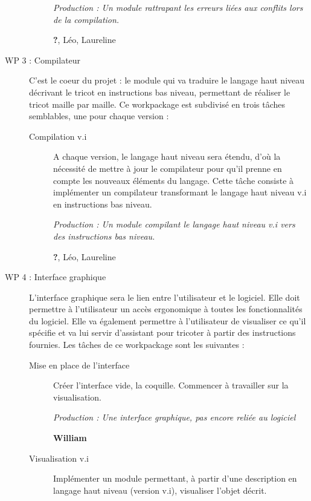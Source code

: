 \documentclass{article}
\begin{document}
\begin{description}
\begin{description}
      \textit{Production : Un module rattrapant les erreurs liées aux conflits lors de la compilation.}

      \textbf{?}, Léo, Laureline

    \end{description}

\medskip

\item[WP 3 : Compilateur] C'est le coeur du projet : le module qui va traduire le langage haut niveau décrivant le tricot en instructions bas niveau, permettant de réaliser le tricot maille par maille. Ce workpackage est subdivisé en trois tâches semblables, une pour chaque version :

    \begin{description}
    \item[Compilation v.i] A chaque version, le langage haut niveau sera étendu, d'où la nécessité de mettre à jour le compilateur pour qu'il prenne en compte les nouveaux éléments du langage. Cette tâche consiste à implémenter un compilateur transformant le langage haut niveau v.i en instructions bas niveau.

      \textit{Production : Un module compilant le langage haut niveau v.i vers des instructions bas niveau.}

      \textbf{?}, Léo, Laureline %
    \end{description}

\medskip

\item[WP 4 : Interface graphique] L'interface graphique sera le lien entre l'utilisateur et le logiciel. Elle doit permettre à l'utilisateur un accès ergonomique à toutes les fonctionnalités du logiciel. Elle va également permettre à l'utilisateur de visualiser ce qu'il spécifie et va lui servir d'assistant pour tricoter à partir des instructions fournies. Les tâches de ce workpackage sont les suivantes :

  \begin{description}
  \item[Mise en place de l'interface] Créer l'interface vide, la coquille. Commencer à travailler sur la visualisation.

    \textit{Production : Une interface graphique, pas encore reliée au logiciel}

    \textbf{William}
	
  \item[Visualisation v.i] Implémenter un module permettant, à partir d'une description en langage haut niveau (version v.i), visualiser l'objet décrit.


\end{description}
\end{description}
\end{document}
